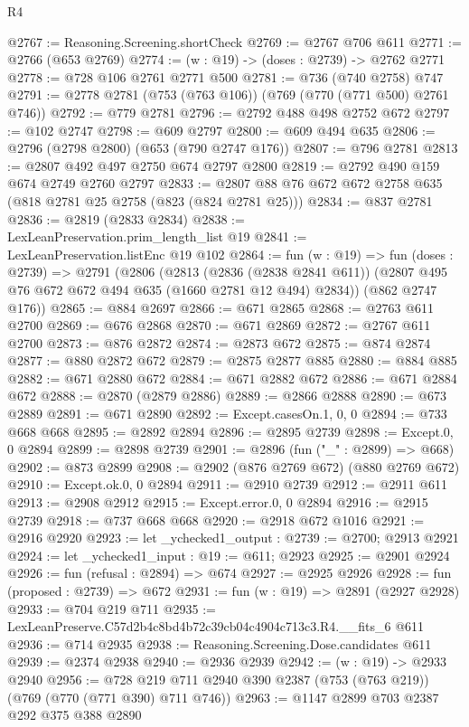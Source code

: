 \begin{lexlean}{R4}
\begin{coremodule}
@2767 := Reasoning.Screening.shortCheck
@2769 := @2767 @706 @611
@2771 := @2766 (@653 @2769)
@2774 := (w : @19) -> (doses : @2739) -> @2762 @2771
@2778 := @728 @106 @2761 @2771 @500
@2781 := @736 (@740 @2758) @747
@2791 := @2778 @2781 (@753 (@763 @106)) (@769 (@770 (@771 @500) @2761 @746))
@2792 := @779 @2781
@2796 := @2792 @488 @498 @2752 @672
@2797 := @102 @2747
@2798 := @609 @2797
@2800 := @609 @494 @635
@2806 := @2796 (@2798 @2800) (@653 (@790 @2747 @176))
@2807 := @796 @2781
@2813 := @2807 @492 @497 @2750 @674 @2797 @2800
@2819 := @2792 @490 @159 @674 @2749 @2760 @2797
@2833 := @2807 @88 @76 @672 @672 @2758 @635 (@818 @2781 @25 @2758 (@823 (@824 @2781 @25)))
@2834 := @837 @2781
@2836 := @2819 (@2833 @2834)
@2838 := LexLeanPreservation.prim_length_list @19
@2841 := LexLeanPreservation.listEnc @19 @102
@2864 := fun (w : @19) =>
  fun (doses : @2739) =>
  @2791
    (@2806
      (@2813
        (@2836 (@2838 @2841 @611))
        (@2807 @495 @76 @672 @672 @494 @635 (@1660 @2781 @12 @494) @2834))
      (@862 @2747 @176))
@2865 := @884 @2697
@2866 := @671 @2865
@2868 := @2763 @611 @2700
@2869 := @676 @2868
@2870 := @671 @2869
@2872 := @2767 @611 @2700
@2873 := @876 @2872
@2874 := @2873 @672
@2875 := @874 @2874
@2877 := @880 @2872 @672
@2879 := @2875 @2877 @885
@2880 := @884 @885
@2882 := @671 @2880 @672
@2884 := @671 @2882 @672
@2886 := @671 @2884 @672
@2888 := @2870 (@2879 @2886)
@2889 := @2866 @2888
@2890 := @673 @2889
@2891 := @671 @2890
@2892 := Except.casesOn.{1, 0, 0}
@2894 := @733 @668 @668
@2895 := @2892 @2894
@2896 := @2895 @2739
@2898 := Except.{0, 0} @2894
@2899 := @2898 @2739
@2901 := @2896 (fun ("_" : @2899) => @668)
@2902 := @873 @2899
@2908 := @2902 (@876 @2769 @672) (@880 @2769 @672)
@2910 := Except.ok.{0, 0} @2894
@2911 := @2910 @2739
@2912 := @2911 @611
@2913 := @2908 @2912
@2915 := Except.error.{0, 0} @2894
@2916 := @2915 @2739
@2918 := @737 @668 @668
@2920 := @2918 @672 @1016
@2921 := @2916 @2920
@2923 := let _ychecked1_output : @2739 := @2700; @2913 @2921
@2924 := let _ychecked1_input : @19 := @611; @2923
@2925 := @2901 @2924
@2926 := fun (refusal : @2894) => @674
@2927 := @2925 @2926
@2928 := fun (proposed : @2739) => @672
@2931 := fun (w : @19) => @2891 (@2927 @2928)
@2933 := @704 @219 @711
@2935 := LexLeanPreserve.C57d2b4c8bd4b72c39cb04c4904c713c3.R4.__fits_6 @611
@2936 := @714 @2935
@2938 := Reasoning.Screening.Dose.candidates @611
@2939 := @2374 @2938
@2940 := @2936 @2939
@2942 := (w : @19) -> @2933 @2940
@2956 := @728 @219 @711 @2940 @390 @2387 (@753 (@763 @219)) (@769 (@770 (@771 @390) @711 @746))
@2963 := @1147 @2899 @703 @2387 @292 @375 @388 @2890

\end{coremodule}
\end{lexlean}
